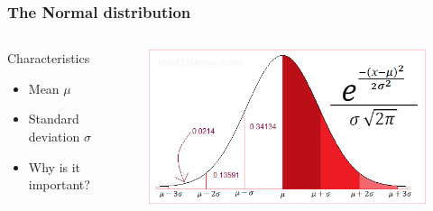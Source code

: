\documentclass[10pt, compress]{beamer}
\begin{document}
\begin{frame}
    \frametitle{The Normal distribution}
    \begin{columns}
        \begin{block}{Characteristics}
            \begin{itemize}
                \item Mean $\mu$
                \item Standard deviation $\sigma$
                \item \alert{Why is it important?}
            \end{itemize}
        \end{block}
        \begin{block}{}
            \begin{figure}
                \begin{center}
                    \includegraphics[scale=0.4]{img/normal-curve.png}
                \end{center}
            \end{figure}
        \end{block}
    \end{columns}
\end{frame}
\end{document}
